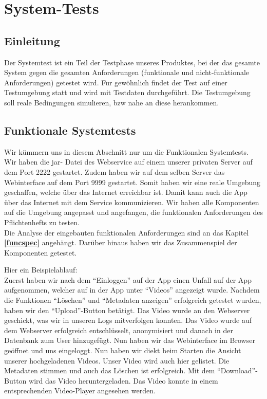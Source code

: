 \section{System-Tests}

\subsection{Einleitung}
Der Systemtest ist ein Teil der Testphase unseres Produktes, bei der das gesamte System gegen die gesamten Anforderungen (funktionale und nicht-funktionale Anforderungen) getestet wird. Fur gewöhnlich findet der Test auf einer Testumgebung statt und wird mit Testdaten durchgeführt. Die Testumgebung soll reale Bedingungen simulieren, bzw nahe an diese herankommen.
\subsection{Funktionale Systemtests}
Wir kümmern uns in diesem Abschnitt nur um die Funktionalen Systemtests.
Wir haben die jar- Datei des Webservice auf einem unserer privaten Server auf dem Port 2222 gestartet. Zudem haben wir auf dem selben Server das Webinterface auf dem Port 9999 gestartet. Somit haben wir eine reale Umgebung geschaffen, welche über das Internet erreichbar ist. Damit kann auch die App über das Internet mit dem Service kommunizieren. Wir haben alle Komponenten auf die Umgebung angepasst und angefangen, die funktionalen Anforderungen des Pflichtenhefts zu testen. \\

Die Analyse der eingebauten funktionalen Anforderungen sind an das Kapitel \textbf{\eqref{funcspec}} angehängt.
Darüber hinaus haben wir das Zusammenspiel der Komponenten getestet. \newline 

Hier ein Beispielablauf:  \\

Zuerst haben wir nach dem ``Einloggen'' auf der App einen Unfall auf der App aufgenommen, welcher auf in der App unter ``Videos'' angezeigt wurde. Nachdem die Funktionen ``Löschen'' und ``Metadaten anzeigen'' erfolgreich getestet wurden, haben wir den ``Upload''-Button betätigt. Das Video wurde an den Webserver geschickt, was wir in unseren Logs mitverfolgen konnten. Das Video wurde auf dem Webserver erfolgreich entschlüsselt, anonymisiert und danach in der Datenbank zum User hinzugefügt. Nun haben wir das Webinterface im Browser geöffnet und uns eingeloggt. Nun haben wir diekt beim Starten die Ansicht unserer hochgeladenen Videos. Unser Video wird auch hier gelistet. Die Metadaten stimmen und auch das Löschen ist erfolgreich. Mit dem ``Download''-Button wird das Video heruntergeladen. Das Video konnte in einem entsprechenden Video-Player angesehen werden.



